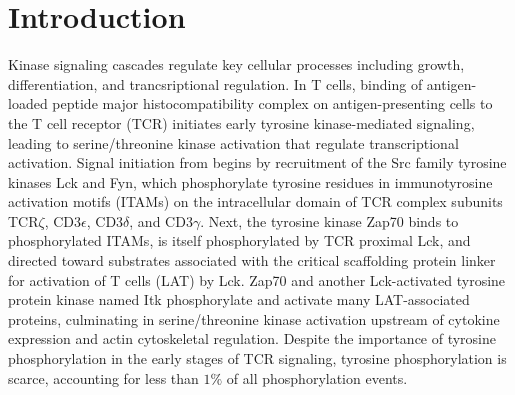 \documentclass[journal=jprobs,manuscript=article]{achemso}
\begin{document}
\section{Introduction}


Kinase signaling cascades regulate key cellular processes including growth, differentiation, and trancsriptional regulation. In T cells, binding of antigen-loaded peptide major histocompatibility complex on antigen-presenting cells to the T cell  receptor (TCR) initiates early tyrosine kinase-mediated signaling, leading to serine/threonine kinase activation that regulate transcriptional activation\cite{gaud2018regulatory}. Signal initiation from begins by recruitment of the Src family tyrosine kinases Lck and Fyn, which phosphorylate tyrosine residues in immunotyrosine activation motifs (ITAMs) on the intracellular domain of TCR complex subunits TCR$\zeta$, CD3$\epsilon$, CD3$\delta$, and CD3$\gamma$\cite{palacios2004function,gaud2018regulatory}. Next, the tyrosine kinase Zap70 binds to phosphorylated ITAMs, is itself phosphorylated by TCR proximal Lck, and directed toward substrates associated with the critical scaffolding protein linker for activation of T cells (LAT) by Lck\cite{lo2018lck}. Zap70 and another Lck-activated tyrosine protein kinase named Itk phosphorylate and activate many LAT-associated proteins, culminating in serine/threonine kinase activation upstream of cytokine expression and actin cytoskeletal regulation\cite{}. Despite the importance of tyrosine phosphorylation in the early stages of TCR signaling, tyrosine phosphorylation is scarce, accounting for less than $1\%$ of all phosphorylation events\cite{hunter1980transforming,hunter2009tyrosine}.%

\end{document}
